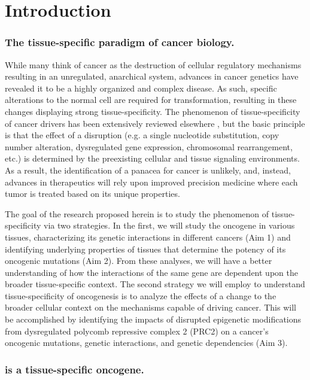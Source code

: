 \chapter{Introduction}

\subsection*{The tissue-specific paradigm of cancer biology.}

While many think of cancer as the destruction of cellular regulatory mechanisms resulting in an unregulated, anarchical system, advances in cancer genetics have revealed it to be a highly organized and complex disease.
As such, specific alterations to the normal cell are required for transformation, resulting in these changes displaying strong tissue-specificity.
The phenomenon of tissue-specificity of cancer drivers has been extensively reviewed elsewhere \cite{Sieber2005TissueCancers., Schneider2017, Haigis2019}, but the basic principle is that the effect of a disruption (e.g. a single nucleotide substitution, copy number alteration, dysregulated gene expression, chromosomal rearrangement, etc.) is determined by the preexisting cellular and tissue signaling environments.
As a result, the identification of a panacea for cancer is unlikely, and, instead, advances in therapeutics will rely upon improved precision medicine where each tumor is treated based on its unique properties.

The goal of the research proposed herein is to study the phenomenon of tissue-specificity via two strategies.
In the first, we will study the oncogene \KRAS{} in various tissues, characterizing its genetic interactions in different cancers (Aim 1) and identifying underlying properties of tissues that determine the potency of its oncogenic mutations (Aim 2).
From these analyses, we will have a better understanding of how the interactions of the same gene are dependent upon the broader tissue-specific context.
The second strategy we will employ to understand tissue-specificity of oncogenesis is to analyze the effects of a change to the broader cellular context on the mechanisms capable of driving cancer.
This will be accomplished by identifying the impacts of disrupted epigenetic modifications from dysregulated polycomb repressive complex 2 (PRC2) on a cancer's oncogenic mutations, genetic interactions, and genetic dependencies (Aim 3).


\subsection*{\KRAS{} is a tissue-specific oncogene.}

